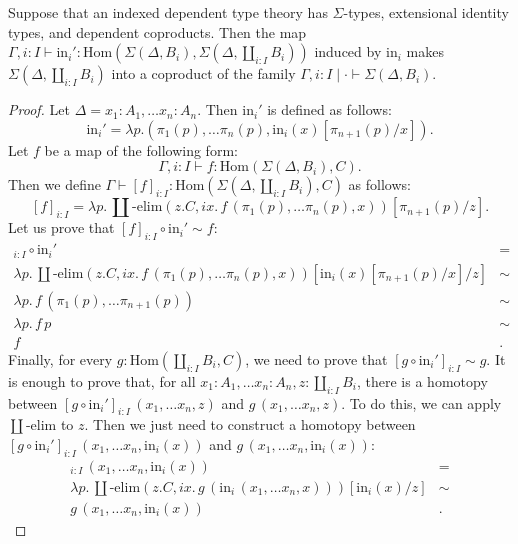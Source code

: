 \documentclass[reqno]{amsart}
\theoremstyle{definition}
\theoremstyle{remark}
\newcommand{\fs}[1]{\mathrm{#1}}
\newcommand{\Hom}{\fs{Hom}}
\numberwithin{figure}{section}
\begin{document}
\begin{lem}
Suppose that an indexed dependent type theory has $\Sigma$-types, extensional identity types, and dependent coproducts.
Then the map $\Gamma, i : I \vdash \fs{in}_i' : \Hom(\Sigma(\Delta,B_i), \Sigma(\Delta, \coprod_{i : I} B_i))$ induced by $\fs{in}_i$ makes $\Sigma(\Delta, \coprod_{i : I} B_i)$ into a coproduct of the family $\Gamma, i : I \mid \cdot \vdash \Sigma(\Delta,B_i)$.
\end{lem}
\begin{proof}
Let $\Delta = x_1 : A_1, \ldots x_n : A_n$.
Then $\fs{in}_i'$ is defined as follows:
\[ \fs{in}_i' = \lambda p.(\pi_1(p), \ldots \pi_n(p), \fs{in}_i(x)[\pi_{n+1}(p)/x]). \]
Let $f$ be a map of the following form:
\[ \Gamma, i : I \vdash f : \Hom(\Sigma(\Delta,B_i),C). \]
Then we define $\Gamma \vdash [f]_{i : I} : \Hom(\Sigma(\Delta, \coprod_{i : I} B_i), C)$ as follows:
\[ [f]_{i : I} = \lambda p.\,\coprod\text{-}\fs{elim}(z.C, i x.\,f\,(\pi_1(p), \ldots \pi_n(p), x))[\pi_{n+1}(p)/z]. \]
Let us prove that $[f]_{i : I} \circ \fs{in}_i' \sim f$:
\begin{align*}
[f]_{i : I} \circ \fs{in}_i' & = \\
\lambda p.\,\coprod\text{-}\fs{elim}(z.C, i x.\,f\,(\pi_1(p), \ldots \pi_n(p), x))[\fs{in}_i(x)[\pi_{n+1}(p)/x]/z] & \sim \\
\lambda p.\,f\,(\pi_1(p), \ldots \pi_{n+1}(p)) & \sim \\
\lambda p.\,f\,p & \sim \\
f & .
\end{align*}
Finally, for every $g : \Hom(\coprod_{i : I} B_i, C)$, we need to prove that $[g \circ \fs{in}_i']_{i : I} \sim g$.
It is enough to prove that, for all $x_1 : A_1, \ldots x_n : A_n, z : \coprod_{i : I} B_i$, there is a homotopy between $[g \circ \fs{in}_i']_{i : I}\,(x_1, \ldots x_n, z)$ and $g\,(x_1, \ldots x_n, z)$.
To do this, we can apply $\coprod\text{-}\fs{elim}$ to $z$.
Then we just need to construct a homotopy between $[g \circ \fs{in}_i']_{i : I}\,(x_1, \ldots x_n, \fs{in}_i(x))$ and $g\,(x_1, \ldots x_n, \fs{in}_i(x))$:
\begin{align*}
[g \circ \fs{in}_i']_{i : I}\,(x_1, \ldots x_n, \fs{in}_i(x)) & = \\
\lambda p.\,\coprod\text{-}\fs{elim}(z.C, i x.\,g\,(\fs{in}_i\,(x_1, \ldots x_n, x)))[\fs{in}_i(x)/z] & \sim \\
g\,(x_1, \ldots x_n, \fs{in}_i(x)) & .
\end{align*}
\end{proof}
\end{document}
